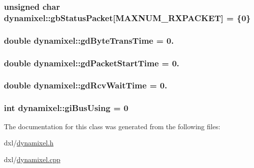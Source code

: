 \subsubsection[{gb\+Status\+Packet}]{\setlength{\rightskip}{0pt plus 5cm}unsigned char dynamixel\+::gb\+Status\+Packet\mbox{[}{\bf M\+A\+X\+N\+U\+M\+\_\+\+R\+X\+P\+A\+C\+K\+E\+T}\mbox{]} = \{0\}\hspace{0.3cm}{\ttfamily [private]}}\label{classdynamixel_aa57c86d3bbbeaf5c9d4f6bd00376b04f}
\hypertarget{classdynamixel_a2173f25c6299da7ddb37ba3d2bf1f738}{}
\subsubsection[{gd\+Byte\+Trans\+Time}]{\setlength{\rightskip}{0pt plus 5cm}double dynamixel\+::gd\+Byte\+Trans\+Time = 0.\hspace{0.3cm}{\ttfamily [private]}}\label{classdynamixel_a2173f25c6299da7ddb37ba3d2bf1f738}
\hypertarget{classdynamixel_a6c6314fb7070e6fd361e57c5de17e0ec}{}
\subsubsection[{gd\+Packet\+Start\+Time}]{\setlength{\rightskip}{0pt plus 5cm}double dynamixel\+::gd\+Packet\+Start\+Time = 0.\hspace{0.3cm}{\ttfamily [private]}}\label{classdynamixel_a6c6314fb7070e6fd361e57c5de17e0ec}
\hypertarget{classdynamixel_a9f47887864517d74955a2bc787ae4456}{}
\subsubsection[{gd\+Rcv\+Wait\+Time}]{\setlength{\rightskip}{0pt plus 5cm}double dynamixel\+::gd\+Rcv\+Wait\+Time = 0.\hspace{0.3cm}{\ttfamily [private]}}\label{classdynamixel_a9f47887864517d74955a2bc787ae4456}
\hypertarget{classdynamixel_ad10e0e49f5fef04bf789a89c14cc470a}{}
\subsubsection[{gi\+Bus\+Using}]{\setlength{\rightskip}{0pt plus 5cm}int dynamixel\+::gi\+Bus\+Using = 0\hspace{0.3cm}{\ttfamily [private]}}\label{classdynamixel_ad10e0e49f5fef04bf789a89c14cc470a}


The documentation for this class was generated from the following files\+:\begin{DoxyCompactItemize}
\item 
dxl/\hyperlink{dynamixel_8h}{dynamixel.\+h}\item 
dxl/\hyperlink{dynamixel_8cpp}{dynamixel.\+cpp}\end{DoxyCompactItemize}
